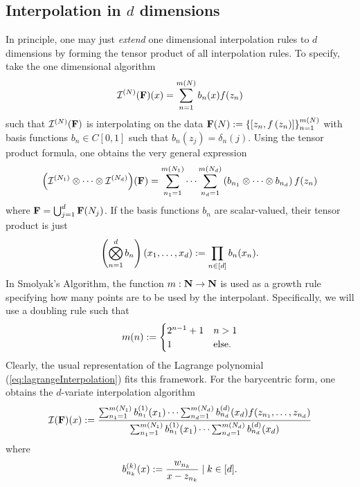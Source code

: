 \documentclass[12pt, oneside]{amsart}
\theoremstyle{definition}
\theoremstyle{remark}
\numberwithin{equation}{section}
\begin{document}
\subsection*{Interpolation in \(d\) dimensions} In principle, one may just \emph{extend} one dimensional interpolation rules to \(d\) dimensions by forming the tensor product of all interpolation rules. To specify, take the one dimensional algorithm
\begin{equation}\label{eq:general1dInterpolation}
    \mathcal{I}^{(N)}(\mathbf{F})(x) = \sum_{n = 1}^{m(N)} b_{n}(x) f(z_n)
\end{equation}
such that \(\mathcal{I}^{(N)}(\mathbf{F})\) is interpolating on the data \(\mathbf{F}(N) := \left\{\left[z_n, f\left(z_n\right)\right]\right\}_{n=1}^{m(N)}\) with basis functions \(b_n \in C[0, 1]\) such that \(b_n(z_j) = \delta_n(j)\). Using the tensor product formula, one obtains the very general expression
\begin{equation}\label{eq:tensorProdInterp}
    {\left( \mathcal{I}^{(N_1)} \otimes \cdots \otimes \mathcal{I}^{(N_d)} \right)}(\mathbf{F})
    = \sum_{n_1 = 1}^{m(N_1)} \cdots \sum_{n_d = 1}^{m(N_d)} \left( b_{n_1} \otimes \cdots \otimes b_{n_d} \right) f(z_{n})
\end{equation}
where \(\mathbf{F} = \bigcup_{j=1}^d \mathbf{F}(N_j)\). If the basis functions \(b_n\) are scalar-valued, their tensor product is just
\begin{equation}\label{eq:tensorProdFunc}
    \left( \bigotimes_{n=1}^d b_n \right)(x_1, \dots, x_d) := \prod_{n \in [d]} b_n(x_n).
\end{equation}
In Smolyak's Algorithm, the function \(m: \mathbf{N} \to \mathbf{N}\) is used as a growth rule specifying how many points are to be used by the interpolant. Specifically, we will use a doubling rule such that \[
    m(n) := \begin{cases}
        2^{n-1}+1 &n > 1\\
        1 &\text{else}.
    \end{cases}
\]
Clearly, the usual representation of the Lagrange polynomial (\ref{eq:lagrangeInterpolation}) fits this framework. For the barycentric form, one obtains the \(d\)-variate interpolation algorithm
\begin{equation}\label{eq:multivarBarycentric}
    \mathcal{I}(\mathbf{F})(x) := \frac{\sum_{n_1=1}^{m(N_1)} b^{(1)}_{n_1}(x_1) \cdots \sum_{n_d=1}^{m(N_d)}b^{(d)}_{n_d}(x_d) f(z_{n_1}, \dots, z_{n_d})}{\sum_{n_1=1}^{m(N_1)} b^{(1)}_{n_1}(x_1) \cdots \sum_{n_d=1}^{m(N_d)}b^{(d)}_{n_d}(x_d)}
\end{equation}
where
\begin{equation}\label{eq:barycentricBasis}
    b^{(k)}_{n_k}(x) := \frac{w_{n_k}}{x-z_{n_k}} \mid k \in [d].
\end{equation}
\end{document}
